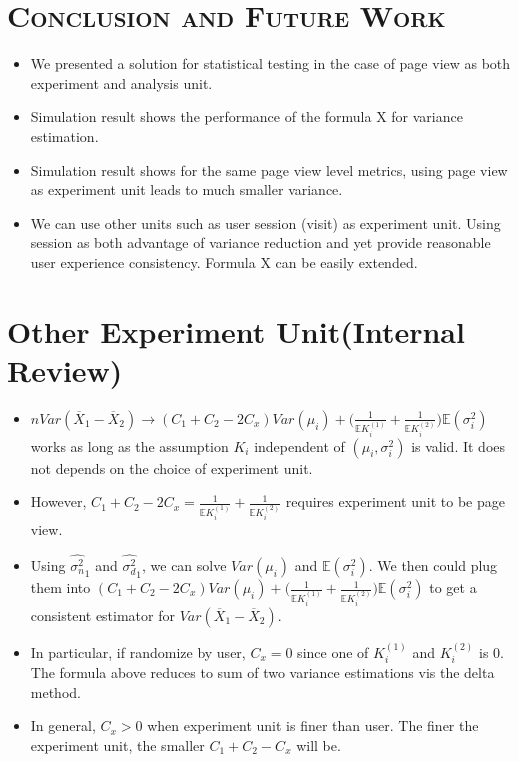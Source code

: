 \documentclass[xcolor=x11names,table]{beamer}
\newcommand{\bbe}{\mathbb{E}}
\newcommand{\wht}{\widehat}
\newcommand{\var}{Var}
\newcommand{\xbar}{\overline{X}}
\newcommand{\naiveest}{\wht{\sigma^2_n}}
\newcommand{\deltaest}{\wht{\sigma^2_d}}
\begin{document}
\section{\scshape Conclusion and Future Work }
\begin{frame}
\begin{itemize}
\item We presented a solution for statistical testing in the case of page view as both experiment and analysis unit.
\item Simulation result shows the performance of the formula X for variance estimation.
\item Simulation result shows for the same page view level metrics, using page view as experiment unit leads to much smaller variance.
\item We can use other units such as user session (visit) as experiment unit. Using session as both advantage of variance reduction and yet provide reasonable user experience consistency.  Formula X can be easily extended. 
\end{itemize}
\end{frame}


 

  
\section{Other Experiment Unit(Internal Review)}
\begin{frame}
\begin{itemize}
\item  $n\var(\xbar_1-\xbar_2) \to (C_1+C_2-2C_x) \var(\mu_i) + \Biggl(\frac{1}{\bbe K_i^{(1)}}+\frac{1}{\bbe K_i^{(2)}}\Biggr )\bbe(\sigma^2_i)$ works as long as the assumption $K_i$ independent of $(\mu_i,\sigma_i^2)$ is valid. \alert{ It does not depends on the choice of experiment unit}.
\item  However, $C_1+C_2-2C_x= \frac{1}{\bbe K_i^{(1)}}+\frac{1}{\bbe K_i^{(2)}}$ requires experiment unit to be page view.
\item Using $\naiveest_1$ and $\deltaest_1$, we  can solve $\var(\mu_i)$ and $\bbe(\sigma_i^2)$. We then could plug them into $(C_1+C_2-2C_x) \var(\mu_i) + \Biggl(\frac{1}{\bbe K_i^{(1)}}+\frac{1}{\bbe K_i^{(2)}}\Biggr )\bbe(\sigma^2_i)$ to get a consistent estimator for $\var(\xbar_1-\xbar_2)$.
\item In particular, if randomize by user, $C_x=0$ since one of $K_i^{(1)}$ and $K_i^{(2)}$ is 0. The formula above reduces to sum of two variance estimations vis the delta method.
\item In general, $C_x>0$ when experiment unit is finer than user. The finer the experiment unit, the smaller $C_1+C_2-C_x$ will be. 
\end{itemize}
\end{frame}
 
\end{document}
